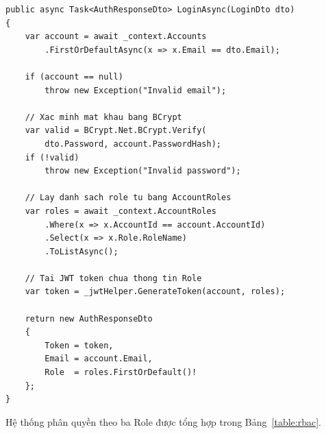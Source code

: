 \begin{lstlisting}[style=csharp,
  caption={AuthService.LoginAsync -- xác thực và cấp JWT},
  label={lst:auth}]
public async Task<AuthResponseDto> LoginAsync(LoginDto dto)
{
    var account = await _context.Accounts
        .FirstOrDefaultAsync(x => x.Email == dto.Email);

    if (account == null)
        throw new Exception("Invalid email");

    // Xac minh mat khau bang BCrypt
    var valid = BCrypt.Net.BCrypt.Verify(
        dto.Password, account.PasswordHash);
    if (!valid)
        throw new Exception("Invalid password");

    // Lay danh sach role tu bang AccountRoles
    var roles = await _context.AccountRoles
        .Where(x => x.AccountId == account.AccountId)
        .Select(x => x.Role.RoleName)
        .ToListAsync();

    // Tai JWT token chua thong tin Role
    var token = _jwtHelper.GenerateToken(account, roles);

    return new AuthResponseDto
    {
        Token = token,
        Email = account.Email,
        Role  = roles.FirstOrDefault()!
    };
}
\end{lstlisting}

Hệ thống phân quyền theo ba Role được tổng hợp trong
Bảng~\ref{table:rbac}.

